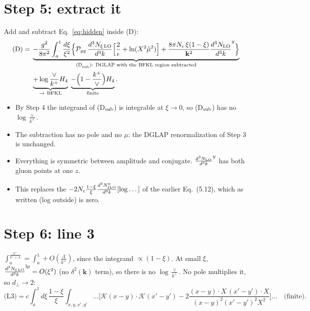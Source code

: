 \documentclass[10pt]{article}
\numberwithin{equation}{section}
\newcommand{\NLO}[1]{\frac{d^3N_{#1}}{d^3k}}
\begin{document}
\section{Step 5: extract it}
Add and subtract Eq.~\eqref{eq:hidden} inside (D):
\begin{align}
{\rm (D)}={}&\underbrace{-\frac{g^2}{8\pi^2}\int_a^1\frac{d\xi}{\xi^2}\Big\{\mathcal P_{gg}\,\NLO{\xi\,\rm LO}\Big[\frac2\epsilon+\ln(X^2\hat\mu^2)\Big]+\frac{8\pi N_c\,\xi(1-\xi)}{\mathbf k^2}\NLO{\rm LO}^{y}\Big\}}_{\text{(D}_{\rm sub}\text{): DGLAP with the BFKL region subtracted}}\notag\\
&\underbrace{+\log\frac{\vee}{k^+}H_4}_{\to\ \rm BFKL}\;\underbrace{-\Big(1-\frac{k^+}{\vee}\Big)H_4}_{\rm finite}.
\end{align}
\begin{itemize}
\item By Step 4 the integrand of (D$_{\rm sub}$) is integrable at $\xi\to0$, so (D$_{\rm sub}$) has no $\log\frac{\vee}{k^+}$.
\item The subtraction has no pole and no $\mu$: the DGLAP renormalization of Step 3 is unchanged.
\item Everything is symmetric between amplitude and conjugate. $\NLO{\rm LO}^y$ has both gluon points at one $z$.
\item This replaces the $-2N_c\frac{1-\xi}{\xi}\frac{d^3N^y_{\xi\rm LO}}{d^3k}[\log\dots]$ of the earlier Eq.~(5.12), which as written (log outside) is zero.
\end{itemize}

\section{Step 6: line 3}
$\int_a^{\frac{k^+}{k^++\Lambda}}=\int_a^1+O(\frac{\Lambda}{k^+})$, since the integrand $\propto(1-\xi)$. At small $\xi$, $\NLO{\xi\,\rm LO}^{\rm lp}=O(\xi^2)$ (no $\delta^2(\mathbf k)$ term), so there is no $\log\frac{\vee}{k^+}$. No pole multiplies it, so $d_\perp\to2$:
\begin{equation}
\text{(L3)}=c\int_a^1d\xi\,\frac{1-\xi}{\xi}\int_{x,y,x',y'}\!\!\dots\Big[\mathcal K(x-y)\cdot\mathcal K(x'-y')-2\frac{(x-y)\cdot X\,(x'-y')\cdot X}{(x-y)^2(x'-y')^2X^2}\Big]\dots\quad\text{(finite)}.
\end{equation}
\end{document}
